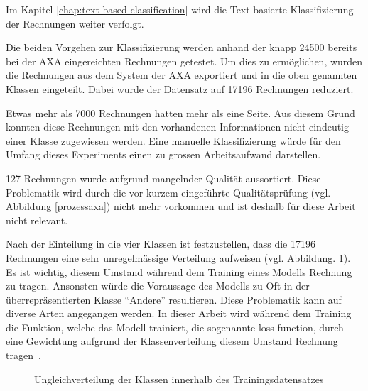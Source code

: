 Im Kapitel \ref{chap:text-based-classification} wird die Text-basierte Klassifizierung der Rechnungen weiter verfolgt.

Die beiden Vorgehen zur Klassifizierung werden anhand der knapp 24500 bereits bei der AXA eingereichten Rechnungen getestet. Um dies zu ermöglichen, wurden die Rechnungen aus dem System der AXA exportiert und in die oben genannten Klassen eingeteilt. Dabei wurde der Datensatz auf 17196 Rechnungen reduziert. 

Etwas mehr als 7000 Rechnungen hatten mehr als eine Seite. Aus diesem Grund konnten diese Rechnungen mit den vorhandenen Informationen nicht eindeutig einer Klasse zugewiesen werden. Eine manuelle Klassifizierung würde für den Umfang dieses Experiments einen zu grossen Arbeitsaufwand darstellen.

127 Rechnungen wurde aufgrund mangelnder Qualität aussortiert. Diese Problematik wird durch die vor kurzem eingeführte Qualitätsprüfung (vgl. Abbildung \ref{prozessaxa}) nicht mehr vorkommen und ist deshalb für diese Arbeit nicht relevant.

Nach der Einteilung in die vier Klassen ist festzustellen, dass die 17196 Rechnungen eine sehr unregelmässige Verteilung aufweisen (vgl. Abbildung. \ref{class-distribution}). Es ist wichtig, diesem Umstand während dem Training eines Modells Rechnung zu tragen. Ansonsten würde die Voraussage des Modells zu Oft in der überrepräsentierten Klasse \enquote{Andere} resultieren. Diese Problematik kann auf diverse Arten angegangen werden. In dieser Arbeit wird während dem Training die Funktion, welche das Modell trainiert, die sogenannte loss function, durch eine Gewichtung aufgrund der Klassenverteilung diesem Umstand Rechnung tragen~\autocite{Buda2018}.

\begin{figure}[h]
    \captionsetup{width=.8\linewidth}
    \caption{Ungleichverteilung der Klassen innerhalb des Trainingsdatensatzes}
    \label{class-distribution}
    \centering
\end{figure}

